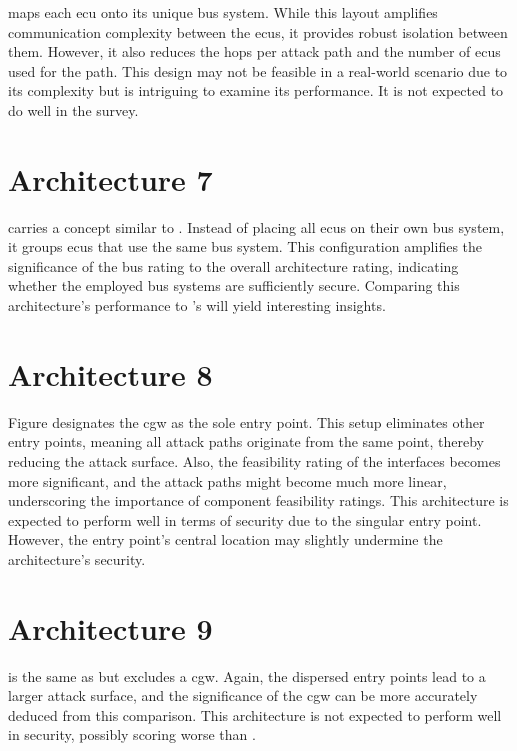  maps each \acrshort{ecu} onto its unique bus system. 
While this layout amplifies communication complexity between the \acrshort{ecu}s, it provides robust isolation between them. 
However, it also reduces the hops per attack path and the number of \acrshort{ecu}s used for the path. 
This design may not be feasible in a real-world scenario due to its complexity but is intriguing to examine its performance. 
It is not expected to do well in the survey.

\section{Architecture 7}
\label{subsec:arch7}

 carries a concept similar to . 
Instead of placing all \acrshort{ecu}s on their own bus system, it groups \acrshort{ecu}s that use the same bus system.
This configuration amplifies the significance of the bus rating to the overall architecture rating, 
indicating whether the employed bus systems are sufficiently secure. 
Comparing this architecture's performance to 's will yield interesting insights.
\section{Architecture 8}
\label{subsec:arch8}

Figure  designates the \acrshort{cgw} as the sole entry point. 
This setup eliminates other entry points, meaning all attack paths originate from the same point, thereby reducing the attack surface. 
Also, the feasibility rating of the interfaces becomes more significant, 
and the attack paths might become much more linear, underscoring the importance of component feasibility ratings. 
This architecture is expected to perform well in terms of security due to the singular entry point. 
However, the entry point's central location may slightly undermine the architecture's security.

\section{Architecture 9}
\label{subsec:arch9}

 is the same as  but excludes a \acrshort{cgw}. 
Again, the dispersed entry points lead to a larger attack surface, and the significance of the \acrshort{cgw} 
can be more accurately deduced from this comparison. 
This architecture is not expected to perform well in security, possibly scoring worse than .
